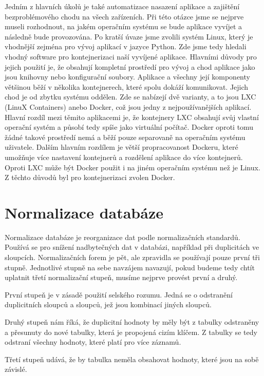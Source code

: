 Jedním z hlavních úkolů je také automatizace nasazení aplikace a
zajištění bezproblémového chodu na všech zařízeních. Při této otázce
jsme se nejprve museli rozhodnout, na jakém operačním systému se bude
aplikace vyvíjet a následně bude provozována. Po kratší úvaze jsme
zvolili systém Linux, který je vhodnější zejména pro vývoj aplikací v
jazyce Python. Zde jsme tedy hledali vhodný software pro
kontejnerizaci naší vyvíjené aplikace. Hlavními důvody pro jejich
použití je, že obsahují kompletní prostředí pro vývoj a chod aplikace
jako jsou knihovny nebo konfigurační soubory. Aplikace a všechny její
komponenty většinou běží v několika kontejnerech, které spolu dokáží
komunikovat. Jejich chod je od zbytku systému oddělen. Zde se nabízejí
dvě varianty, a to jsou LXC (LinuX Containers) anebo Docker, což jsou
jedny z nejpoužívanějších aplikací. Hlavní rozdíl mezi těmito
aplikacemi je, že kontejnery LXC obsahují svůj vlastní operační systém
a působí tedy spíše jako virtuální počítač. Docker oproti tomu žádné
takové prostředí nemá a běží pouze separovaně na operačním systému
uživatele. Dalším hlavním rozdílem je větší propracovanost Dockeru,
které umožňuje více nastavení kontejnerů a rozdělení aplikace do více
kontejnerů. Oproti LXC může být Docker použit i na
jiném operačním systému než je Linux. Z těchto důvodů byl pro
kontejnerizaci zvolen Docker. \cite{deployment}

\newpage

\section{Normalizace databáze}

Normalizace databáze je reorganizace dat podle normalizačních standardů. 
Používá se pro snížení nadbytečných dat v databázi, například při duplicitách 
ve sloupcích. Normalizačních forem je pět, ale zpravidla se používají pouze 
první tři stupně. Jednotlivé stupně na sebe navzájem navazují, pokud budeme 
tedy chtít uplatnit třetí normalizační stupeň, musíme nejprve provést první a druhý.

První stupeň je v zásadě použití selského rozumu. Jedná se o odstranění 
duplicitních sloupců a sloupců, jež jsou kombinací jiných sloupců.

Druhý stupeň nám říká, že duplicitní hodnoty by měly být z tabulky odstraněny 
a přesunuty do nové tabulky, která je propojená cizím klíčem. Z tabulky se tedy 
odstraní všechny hodnoty, které platí pro více záznamů.

Třetí stupeň udává, že by tabulka neměla obsahovat hodnoty, které jsou na sobě závislé. 

